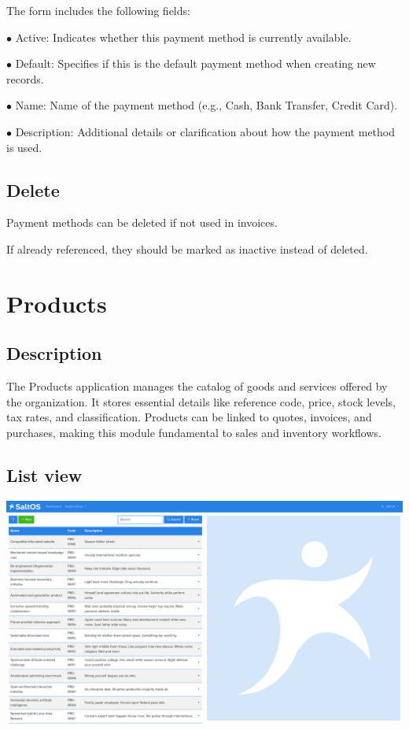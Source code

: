 \documentclass[a4paper]{article}
\begin{document}
The form includes the following fields:

\begin{compactitem}
\item[\color{myblue}$\bullet$] Active: Indicates whether this payment method is currently available.
\item[\color{myblue}$\bullet$] Default: Specifies if this is the default payment method when creating new records.
\item[\color{myblue}$\bullet$] Name: Name of the payment method (e.g., Cash, Bank Transfer, Credit Card).
\item[\color{myblue}$\bullet$] Description: Additional details or clarification about how the payment method is used.
\end{compactitem}

\hypertarget{toc150}{}
\subsection{Delete}

Payment methods can be deleted if not used in invoices.

If already referenced, they should be marked as inactive instead of deleted.


\hypertarget{toc151}{}
\section{Products}

\hypertarget{toc152}{}
\subsection{Description}

The Products application manages the catalog of goods and services offered by the organization.
It stores essential details like reference code, price, stock levels, tax rates, and classification.
Products can be linked to quotes, invoices, and purchases, making this module fundamental to sales and inventory workflows.

\hypertarget{toc153}{}
\subsection{List view}

\begin{center}\includegraphics[width=1\textwidth]{../ujest/snaps/test-screenshots-js-screenshots-sales-products-list-en-us-1-snap.png}\end{center}
\end{document}
